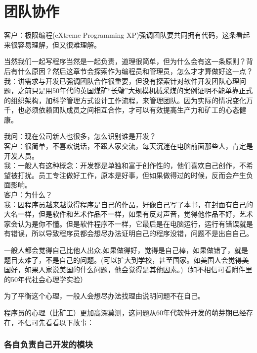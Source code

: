 \chapter{团队协作} %

客户：极限编程(eXtreme Programming
XP)强调团队要共同拥有代码，这条看起来很容易理解，但又很难理解。

当然我们一起写程序当然是一起负责，道理很简单，但为什么会有这一条原则？背后有什么原因？然后这章节会探索作为编程员和管理员，怎么才才算做好这一点？\\

我：讲需求与开发已强调团队合作很重要，但没有探索针对软件开发团队心理问题，之前只是用50年代的英国煤矿``长璧''大规模机械采煤的案例证明不能单靠正式的组织架构，加科学管理方式设计工作流程，来管理团队。因为实际的情况变化万千，也必须依赖团队成员之间相互合作，才可以有效提高生产力和矿工的心态健康。

我问：现在公司新人也很多，怎么识别谁是开发？\\
客户：很简单，不喜欢说话，不跟人家交流，每天沉迷在电脑前面那些人，肯定是开发人员。\\
我：一般人有这种概念：开发都是单独和富于创作性的，他们喜欢自己创作，不希望被打扰。员工专注做好工作，原本是好事，但如果做得过的时候，反而会产生负面影响。\\
客户：为什么？\\
我：因程序员越来越觉得程序是自己的作品，好像自己写了本书，在封面有自己的大名一样，但是软件和艺术作品不一样，如果有反对声音，觉得他作品不好，艺术家会认为是你不懂。但是软件程序不一样，它最后是在电脑运行，运行有错误就是有错误，所以导致程序员都会想尽办法证明自己的程序没错，问题不是出自自己。

一般人都会觉得自己比他人出众,如果做得好，觉得是自己棒，如果做错了，就是题目太难了，不是自己的问题。(可以扩大到学校，甚至国家。如美国人会觉得美国好，如果人家说美国的什么问题，他会觉得是其他因素。)（如不相信可看附件里的50年代社会心理学实验）

为了平衡这个心理，一般人会想尽办法找理由说明问题不在自己。

程序员的心理（比矿工）更加高深莫测，这问题从60年代软件开发的萌芽期已经存在，不信可先看看以下故事：

\hypertarget{ux5404ux81eaux8d1fux8d23ux81eaux5df1ux5f00ux53d1ux7684ux6a21ux5757}{%
\subsection{各自负责自己开发的模块}\label{ux5404ux81eaux8d1fux8d23ux81eaux5df1ux5f00ux53d1ux7684ux6a21ux5757}}

